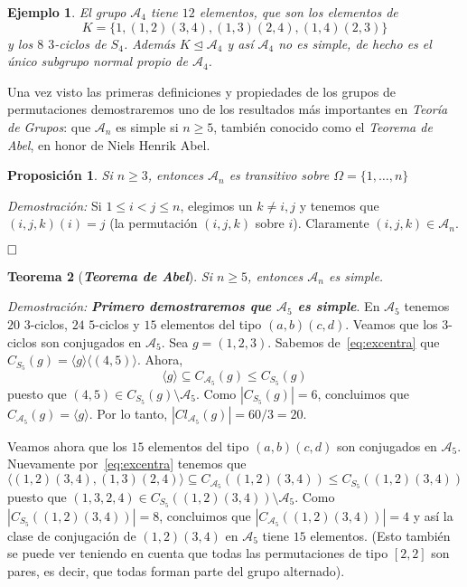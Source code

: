 \documentclass[12pt]{article}
\newtheorem{theorem}{Teorema}[section]
\newtheorem{proposition}[theorem]{Proposición}
\newtheorem{example}{Ejemplo}[theorem]
\begin{document}
\begin{example} El grupo $\mathcal{A}_{4}$ tiene $12$ elementos, que son los elementos de $$K = \lbrace 1,(1,2)(3,4),(1,3)(2,4),(1,4)(2,3) \rbrace$$ y los $8$ $3$-ciclos de $S_{4}$. Además $K \unlhd \mathcal{A}_{4}$ y así $\mathcal{A}_{4}$ no es simple, de hecho es el único subgrupo normal propio de $\mathcal{A}_{4}$.
\end{example}

Una vez visto las primeras definiciones y propiedades de los grupos de permutaciones demostraremos uno de los resultados más importantes en \textit{Teoría de Grupos}: que $\mathcal{A}_{n}$ es simple si $n \geq 5$, también conocido como el \textit{Teorema de Abel}, en honor de Niels Henrik Abel.

\begin{proposition}\label{eq:preabel} Si $n \geq 3$, entonces $\mathcal{A}_{n}$ es transitivo sobre $\Omega =\lbrace 1, \ldots, n \rbrace$
\end{proposition}
\emph{Demostración: } Si $1 \leq i <j \leq n$, elegimos un $k \neq i,j$ y tenemos que $(i,j,k)(i) = j$ (la permutación $(i,j,k)$ sobre $i$). Claramente $(i,j,k) \in \mathcal{A}_{n}$.

$\hfill \square$

\begin{theorem}[\textbf{\textit{Teorema de Abel}}] Si $n \geq 5$, entonces $\mathcal{A}_{n}$ es simple.
\end{theorem}
\emph{Demostración: }\textbf{\textit{Primero demostraremos que $\mathcal{A}_{5}$ es simple}}. En $\mathcal{A}_{5}$ tenemos $20$ $3$-ciclos, $24$ $5$-ciclos y $15$ elementos del tipo $(a,b)(c,d)$. Veamos que los $3$-ciclos son conjugados en $\mathcal{A}_{5}$. Sea $g = (1,2,3)$. Sabemos de~\ref{eq:excentra} que $C_{S_{5}}(g)= \langle g\rangle \langle(4,5) \rangle$. Ahora, $$\langle g \rangle \subseteq C_{\mathcal{A}_{5}}(g) \leq C_{S_{5}}(g)$$ puesto que $(4,5) \in C_{S_{5}}(g) \setminus \mathcal{A}_{5}$. Como $|C_{S_{5}}(g)| = 6$, concluimos que $C_{\mathcal{A}_{5}}(g) = \langle g \rangle$. Por lo tanto, $|Cl_{\mathcal{A}_{5}}(g)| = 60/3 = 20.$ 

Veamos ahora que los $15$ elementos del tipo $(a,b)(c,d)$ son conjugados en $\mathcal{A}_{5}$. Nuevamente por~\ref{eq:excentra} tenemos que $$\langle (1,2)(3,4),(1,3)(2,4) \rangle \subseteq C_{\mathcal{A}_{5}}((1,2)(3,4)) \leq C_{S_{5}}((1,2)(3,4))$$ puesto que $(1,3,2,4) \in C_{S_{5}}((1,2)(3,4)) \setminus \mathcal{A}_{5}$. Como $|C_{S_{5}}((1,2)(3,4))| = 8$, concluimos que $|C_{\mathcal{A}_{5}}((1,2)(3,4))| = 4$ y así la clase de conjugación de $(1,2)(3,4)$ en $\mathcal{A}_{5}$ tiene $15$ elementos. (Esto también se puede ver teniendo en cuenta que todas las permutaciones de tipo $[2,2]$ son pares, es decir, que todas forman parte del grupo alternado).
\end{document}
